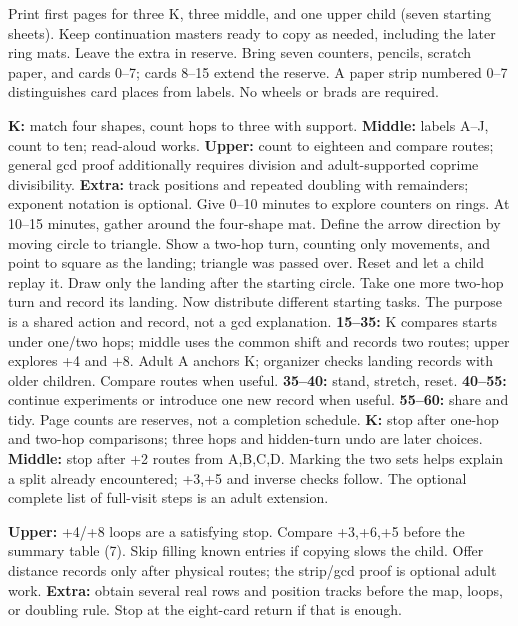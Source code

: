 \documentclass[12pt]{extarticle}
\begin{document}
Print first pages for three K, three middle, and one upper child (seven starting sheets). Keep continuation masters ready to copy as needed, including the later ring mats. Leave the extra in reserve. Bring seven counters, pencils, scratch paper, and cards 0--7; cards 8--15 extend the reserve. A paper strip numbered 0--7 distinguishes card places from labels. No wheels or brads are required.\par
\textbf{K:} match four shapes, count hops to three with support. \textbf{Middle:} labels A--J, count to ten; read-aloud works. \textbf{Upper:} count to eighteen and compare routes; general gcd proof additionally requires division and adult-supported coprime divisibility. \textbf{Extra:} track positions and repeated doubling with remainders; exponent notation is optional.
Give 0--10 minutes to explore counters on rings. At 10--15 minutes, gather around the four-shape mat. Define the arrow direction by moving circle to triangle. Show a two-hop turn, counting only movements, and point to square as the landing; triangle was passed over. Reset and let a child replay it. Draw only the landing after the starting circle. Take one more two-hop turn and record its landing. Now distribute different starting tasks. The purpose is a shared action and record, not a gcd explanation.
\textbf{15--35:} K compares starts under one/two hops; middle uses the common shift and records two routes; upper explores +4 and +8. Adult A anchors K; organizer checks landing records with older children. Compare routes when useful. \textbf{35--40:} stand, stretch, reset. \textbf{40--55:} continue experiments or introduce one new record when useful. \textbf{55--60:} share and tidy. Page counts are reserves, not a completion schedule.
\textbf{K:} stop after one-hop and two-hop comparisons; three hops and hidden-turn undo are later choices. \textbf{Middle:} stop after +2 routes from A,B,C,D. Marking the two sets helps explain a split already encountered; +3,+5 and inverse checks follow. The optional complete list of full-visit steps is an adult extension.\par
\textbf{Upper:} +4/+8 loops are a satisfying stop. Compare +3,+6,+5 before the summary table (7). Skip filling known entries if copying slows the child. Offer distance records only after physical routes; the strip/gcd proof is optional adult work. \textbf{Extra:} obtain several real rows and position tracks before the map, loops, or doubling rule. Stop at the eight-card return if that is enough.
\end{document}
